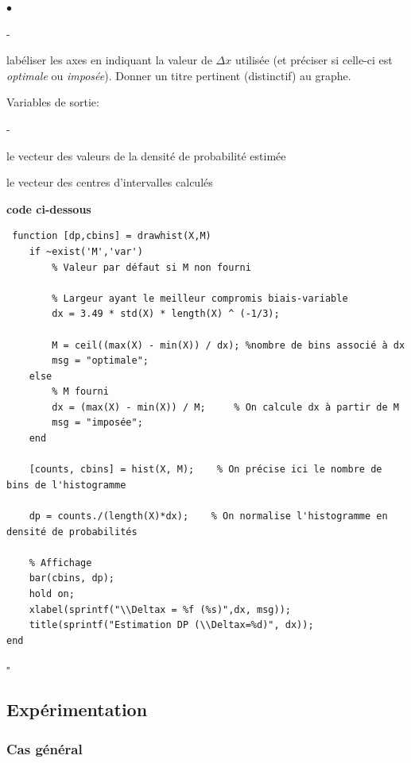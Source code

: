\documentclass{article}
\newcommand{\debutrep}[1]{\color{blue}\begin{center} \hrulefill \textbf{ #1 } \hrulefill \end{center} }
\newcommand{\finrep}{\vspace*{5mm}\hfill $\square$\color{black}\vspace*{5mm}}
\begin{document}
\begin{list}{$\bullet$}{\setlength{\leftmargin}{3mm} \setlength{\labelwidth}{20mm} \setlength{\labelsep}{2mm} \setlength{\itemsep}{1mm} }
\begin{list}{-}{\setlength{\leftmargin}{3mm} \setlength{\labelwidth}{20mm} \setlength{\labelsep}{2mm} \setlength{\itemsep}{1mm} }
\item labéliser les axes en indiquant la valeur de $\Delta x$ utilisée (et préciser si celle-ci est {\em optimale} ou {\em imposée}). Donner un titre pertinent (distinctif) au graphe.
\end{list}
\item Variables de sortie:
\begin{list}{-}{\setlength{\leftmargin}{3mm} \setlength{\labelwidth}{20mm} \setlength{\labelsep}{2mm} \setlength{\itemsep}{1mm} }
\item le vecteur des valeurs de la densité de probabilité estimée
\item le vecteur des centres d'intervalles calculés
\end{list}
\end{list}

\debutrep{code ci-dessous}
 \begin{verbatim}
 function [dp,cbins] = drawhist(X,M)
    if ~exist('M','var')
        % Valeur par défaut si M non fourni
                
        % Largeur ayant le meilleur compromis biais-variable
        dx = 3.49 * std(X) * length(X) ^ (-1/3);
        
        M = ceil((max(X) - min(X)) / dx); %nombre de bins associé à dx
        msg = "optimale";
    else
        % M fourni
        dx = (max(X) - min(X)) / M;     % On calcule dx à partir de M
        msg = "imposée";
    end
    
    [counts, cbins] = hist(X, M);    % On précise ici le nombre de bins de l'histogramme

    dp = counts./(length(X)*dx);    % On normalise l'histogramme en densité de probabilités
    
    % Affichage
    bar(cbins, dp); 
    hold on;
    xlabel(sprintf("\\Deltax = %f (%s)",dx, msg));
    title(sprintf("Estimation DP (\\Deltax=%d)", dx));
end

 \end{verbatim}
\finrep

\subsection{Expérimentation}

\subsubsection{Cas général}
\end{document}
